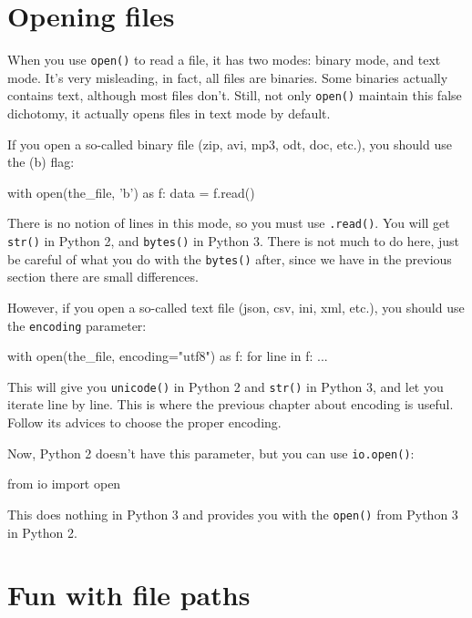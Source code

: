 \section{Opening files}

When you use \lstinline{open()} to read a file, it has two modes: binary mode, and text mode. It's very misleading, in fact, all files are binaries. Some binaries actually contains text, although most files don't. Still, not only \lstinline{open()} maintain this false dichotomy, it actually opens files in text mode by default.

If you open a so-called binary file (zip, avi, mp3, odt, doc, etc.), you should use the \textquote(b) flag:

\begin{py2and3}
with open(the_file, 'b') as f:
    data = f.read()
\end{py2and3}

There is no notion of lines in this mode, so you must use \lstinline{.read()}. You will get \lstinline{str()} in Python 2, and \lstinline{bytes()} in Python 3. There is not much to do here, just be careful of what you do with the \lstinline{bytes()} after, since we have in the previous section there are small differences.

However, if you open a so-called text file (json, csv, ini, xml, etc.), you should use the \lstinline{encoding} parameter:

\begin{py3}
with open(the_file, encoding="utf8") as f:
    for line in f:
        ...
\end{py3}

This will give you \lstinline{unicode()} in Python 2 and \lstinline{str()} in Python 3, and let you iterate line by line. This is where the previous chapter about encoding is useful. Follow its advices to choose the proper encoding.

Now, Python 2 doesn't have this parameter, but you can use \lstinline{io.open()}:

\begin{py2and3}
from io import open
\end{py2and3}

This does nothing in Python 3 and provides you with the \lstinline{open()} from Python 3 in Python 2.

\section{Fun with file paths}

